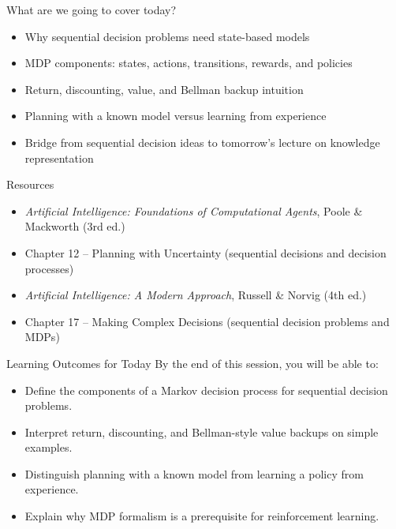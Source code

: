 \documentclass[aspectratio=169]{beamer}
\newcommand{\defaultdeckrefs}{AIMA4e Ch.22 pp.789--822; Poole3e Ch.13 pp.583--608}
\newcommand{\currentsliderefs}{\defaultdeckrefs}
\newcommand{\setslideref}[1]{\gdef\currentsliderefs{#1}}
\begin{document}
\setslideref{AIMA4e Ch.17 -- Making Complex Decisions; Poole3e Ch.12 -- Planning with Uncertainty}
\begin{frame}{What are we going to cover today?}
\begin{itemize}
  \item Why sequential decision problems need state-based models
  \item MDP components: states, actions, transitions, rewards, and policies
  \item Return, discounting, value, and Bellman backup intuition
  \item Planning with a known model versus learning from experience
  \item Bridge from sequential decision ideas to tomorrow's lecture on knowledge representation
\end{itemize}
\end{frame}

\setslideref{AIMA4e Ch.17 -- Making Complex Decisions; Poole3e Ch.12 -- Planning with Uncertainty}
\begin{frame}{Resources}
\begin{itemize}
  \item \textit{Artificial Intelligence: Foundations of Computational Agents}, Poole \& Mackworth (3rd ed.)
  \item Chapter 12 -- Planning with Uncertainty (sequential decisions and decision processes)
  \item \textit{Artificial Intelligence: A Modern Approach}, Russell \& Norvig (4th ed.)
  \item Chapter 17 -- Making Complex Decisions (sequential decision problems and MDPs)
\end{itemize}
\end{frame}

\setslideref{AIMA4e Ch.17 -- Making Complex Decisions; Poole3e Ch.12 -- Planning with Uncertainty}
\begin{frame}{Learning Outcomes for Today}
By the end of this session, you will be able to:
\begin{itemize}
  \item Define the components of a Markov decision process for sequential decision problems.
  \item Interpret return, discounting, and Bellman-style value backups on simple examples.
  \item Distinguish planning with a known model from learning a policy from experience.
  \item Explain why MDP formalism is a prerequisite for reinforcement learning.
\end{itemize}
\end{frame}
\end{document}

